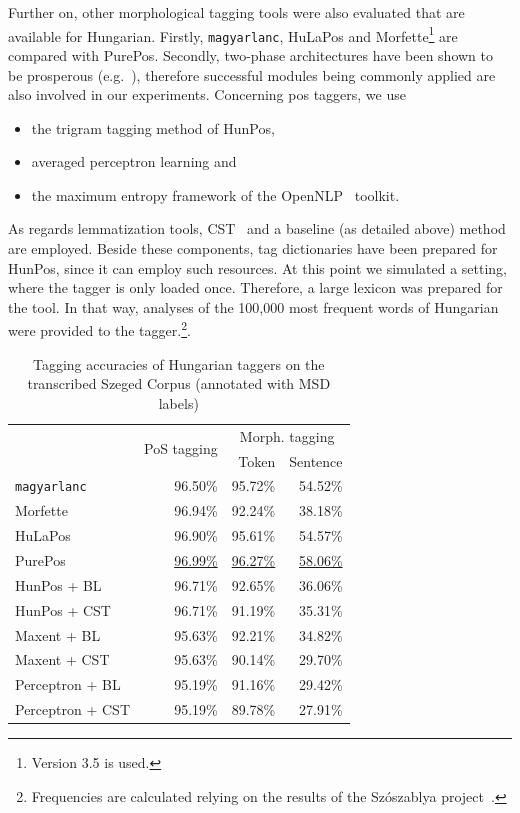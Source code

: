 Further on, other morphological tagging tools were also evaluated that are available for Hungarian. 
Firstly, \texttt{magyarlanc}, HuLaPos and Morfette\footnote{Version 3.5 is used.} are compared with PurePos.  
Secondly, two-phase architectures have been shown to be prosperous (e.g.~\cite{Agic2013,Erjavec2004}), therefore successful modules being commonly applied are also involved in our experiments. 
Concerning \gls{pos} taggers, we use
\begin{itemize}
  \item the trigram tagging method of HunPos,
  \item averaged perceptron learning and
  \item the maximum entropy framework of the OpenNLP~\cite{Baldridge2002} toolkit.
\end{itemize}

As regards lemmatization tools, CST~\cite{Jongejan} and a baseline (as detailed above) method are employed. 
Beside these components, tag dictionaries have been prepared for HunPos, since it can employ such resources.  
At this point we simulated a setting, where the tagger is only loaded once.
Therefore, a large lexicon was prepared for the tool.
In that way, analyses of the 100,000 most frequent words of Hungarian were provided to the tagger.\footnote{Frequencies are calculated relying on the results of the Szószablya project~\cite{Halacsy2004}.}.


\begin{table}[H]
 \centering
 \caption{Tagging accuracies of Hungarian taggers on the transcribed Szeged Corpus (annotated with MSD labels)}
\begin{tabular}{l r r r}
  \hline
   & \multirow{2}{*}{PoS tagging} & \multicolumn{2}{c}{Morph. tagging} \\
   & &  Token &  Sentence \\
  \hline
  \texttt{magyarlanc} &  96.50\% &  95.72\% &  54.52\% \\
  Morfette &  96.94\% &  92.24\% &  38.18\% \\
  HuLaPos &  96.90\% &   95.61\% & 54.57\% \\
  PurePos &  \underline{96.99\%} &  \underline{96.27\%} &  \underline{58.06\%} \\
  HunPos + BL &  96.71\% &  92.65\% &  36.06\% \\
  HunPos + CST &  96.71\% &  91.19\% &  35.31\% \\
  Maxent + BL &  95.63\% &  92.21\% &  34.82\% \\
  Maxent + CST &  95.63\% &  90.14\% &  29.70\% \\
  Perceptron + BL &  95.19\% &  91.16\% &  29.42\% \\
  Perceptron + CST &  95.19\% &  89.78\% &  27.91\% \\
  \hline
\end{tabular}
\label{tab:morphtag-orig}
\end{table}


